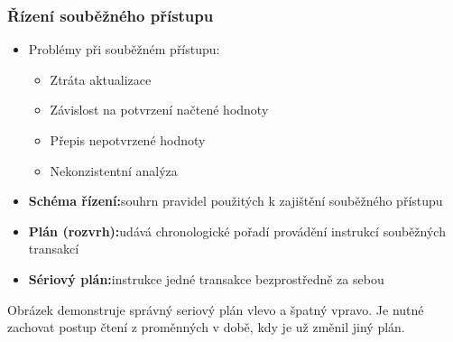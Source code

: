 \documentclass[a4paper,10pt]{article}
\newcommand{\pojem}[2]{\item \textbf{#1:}\quad #2}
\begin{document}
				\subsubsection{Řízení souběžného přístupu}
				\begin{itemize}
					\item Problémy při souběžném přístupu:
					\begin{itemize}
						\item Ztráta aktualizace
						\item Závislost na potvrzení načtené hodnoty
						\item Přepis nepotvrzené hodnoty
						\item Nekonzistentní analýza
					\end{itemize}
					\pojem{Schéma řízení}{souhrn pravidel použitých k zajištění souběžného přístupu}
					\pojem{Plán (rozvrh)}{udává chronologické pořadí provádění instrukcí souběžných transakcí}
					\pojem{Sériový plán}{instrukce jedné transakce bezprostředně za sebou}
				\end{itemize}
				\begin{figure}[h!]
					\centering
				\end{figure}
				Obrázek demonstruje správný seriový plán vlevo a špatný vpravo. Je nutné zachovat postup čtení z proměnných v době, kdy je už změnil jiný plán.
\end{document}
